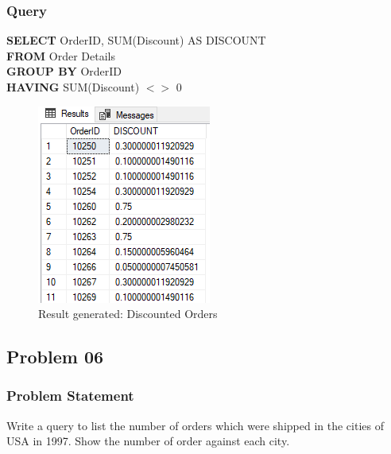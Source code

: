 \documentclass[12pt,a4paper]{report}
\begin{document}
\subsubsection{Query}
\begin{center}
	\begin{minipage}{12cm}
		\textbf{SELECT} OrderID, SUM(Discount) AS  DISCOUNT\\
		\textbf{FROM} Order Details\\
		\textbf{GROUP BY} OrderID\\
		\textbf{HAVING} SUM(Discount) $<>$ 0
	\end{minipage}
	\begin{figure}[h]
	\centering
		\includegraphics[scale=0.7]{images/10.png}
		\caption{Result generated: Discounted Orders}
	\end{figure}
\end{center}

\subsection{Problem 06}
\subsubsection{Problem Statement}
Write a query to list the number of orders which were shipped in the cities of USA in 1997. Show the 
number of order against each city. 
\end{document}
